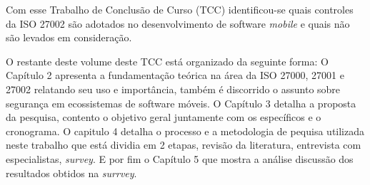
Com esse Trabalho de Conclusão de Curso (TCC) identificou-se quais controles da ISO 27002 são adotados no desenvolvimento de software \textit{mobile} e quais não são levados em consideração.


O restante deste volume deste TCC está organizado da seguinte forma: O Capítulo 2 apresenta a fundamentação teórica na área da ISO 27000, 27001 e 27002 relatando seu uso e importância, também é discorrido o assunto sobre segurança em ecossistemas de software móveis. O Capítulo 3 detalha a proposta da pesquisa, contento o objetivo geral juntamente com os específicos e o cronograma. O capitulo 4 detalha o processo e a metodologia de pequisa utilizada neste trabalho que está dividia em 2 etapas, revisão da literatura, entrevista com especialistas, \textit{survey}. E por fim o Capítulo 5 que mostra a análise discussão dos resultados obtidos na \textit{surrvey}.







 
